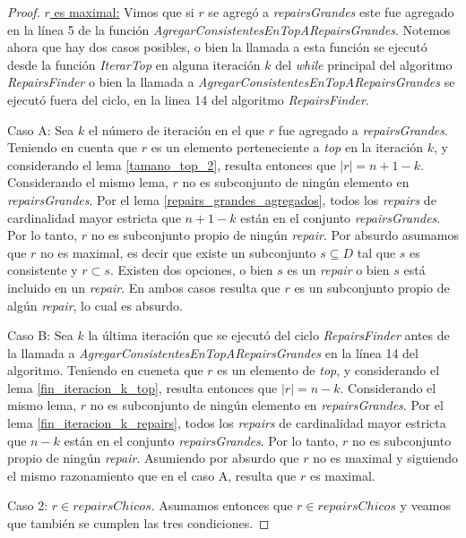 \documentclass[11pt,a4paper,twoside]{tesis}
\begin{document}
\begin{proof}
\underline{$r$ es maximal:}  Vimos que si $r$ se agregó a \textit{repairsGrandes} este fue agregado en la línea 5 de la función \textit{AgregarConsistentesEnTopARepairsGrandes}. Notemos ahora que hay dos casos posibles, o bien la llamada a esta función se ejecutó desde la función \textit{IterarTop} en alguna iteración $k$ del \textit{while} principal del algoritmo \textit{RepairsFinder} o bien la llamada a \textit{AgregarConsistentesEnTopARepairsGrandes} se ejecutó fuera del ciclo, en la linea 14 del algoritmo \textit{RepairsFinder}.

Caso A: Sea $k$ el número de iteración en el que $r$ fue agregado a \textit{repairsGrandes}. Teniendo en cuenta que $r$ es un elemento perteneciente a \textit{top} en la iteración $k$, y considerando el lema \ref{tamano_top_2}, resulta entonces que $|r| = n + 1 - k$. Considerando el mismo lema, $r$ no es subconjunto de ningún elemento en \textit{repairsGrandes}.
Por el lema \ref{repairs_grandes_agregados}, todos los \textit{repairs} de cardinalidad mayor estricta que $n + 1 - k$ están en el conjunto \textit{repairsGrandes}. Por lo tanto, $r$ no es subconjunto propio de ningún \textit{repair}. Por absurdo asumamos que $r$ no es maximal, es decir que existe un subconjunto $s \subseteq D$ tal que $s$ es consistente y $r \subset s$. Existen dos opciones, o bien $s$ es un \textit{repair} o bien $s$ está incluido en un \textit{repair}. En ambos casos resulta que $r$ es un subconjunto propio de algún \textit{repair}, lo cual es absurdo.

Caso B: Sea $k$ la última iteración que se ejecutó del ciclo \textit{RepairsFinder} antes de la llamada a \textit{AgregarConsistentesEnTopARepairsGrandes} en la línea 14 del algoritmo. Teniendo en cueneta que $r$ es un elemento de \textit{top}, y considerando el lema \ref{fin_iteracion_k_top}, resulta entonces que $|r| = n - k$. Considerando el mismo lema, $r$ no es subconjunto de ningún elemento en \textit{repairsGrandes}.
Por el lema \ref{fin_iteracion_k_repairs}, todos los \textit{repairs} de cardinalidad mayor estricta que $n - k$ están en el conjunto \textit{repairsGrandes}. Por lo tanto, $r$ no es subconjunto propio de ningún \textit{repair}. Asumiendo por absurdo que $r$ no es maximal y siguiendo el mismo razonamiento que en el caso A, resulta que $r$ es maximal.  

Caso 2: $r \in repairsChicos$. Asumamos entonces que $r \in repairsChicos$ y veamos que también se cumplen las tres condiciones.


\end{proof}
\end{document}
